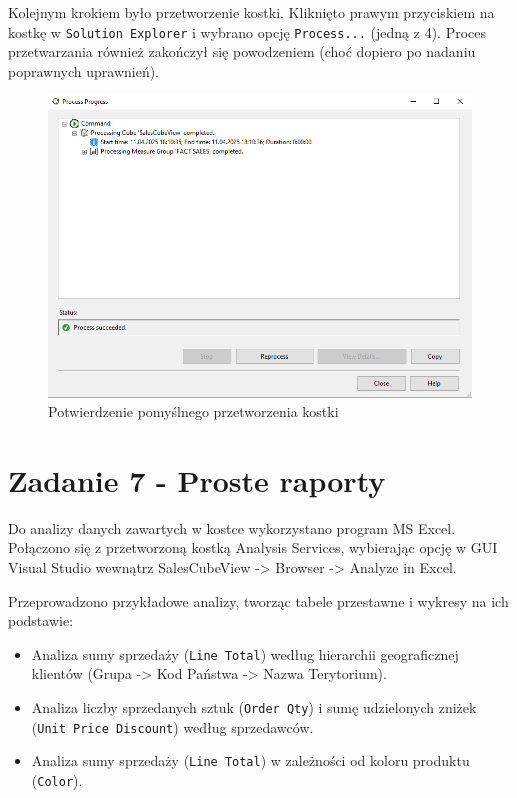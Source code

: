 \documentclass[a4paper,12pt]{article}
\begin{document}
Kolejnym krokiem było przetworzenie kostki. Kliknięto prawym przyciskiem na kostkę w \texttt{Solution Explorer} i wybrano opcję \texttt{Process...} (jedną z 4). Proces przetwarzania również zakończył się powodzeniem (choć dopiero po nadaniu poprawnych uprawnień).

\begin{figure}[H]
    \centering
    \includegraphics[width=1.0\textwidth]{images/6_success.png}
    \caption{Potwierdzenie pomyślnego przetworzenia kostki}
\end{figure}

\section{Zadanie 7 - Proste raporty}

Do analizy danych zawartych w kostce wykorzystano program MS Excel. Połączono się z przetworzoną kostką Analysis Services, wybierając opcję w GUI Visual Studio wewnątrz SalesCubeView -> Browser -> Analyze in Excel.

Przeprowadzono przykładowe analizy, tworząc tabele przestawne i wykresy na ich podstawie:
\begin{itemize}
    \item Analiza sumy sprzedaży (\texttt{Line Total}) według hierarchii geograficznej klientów (Grupa -> Kod Państwa -> Nazwa Terytorium).
    \item Analiza liczby sprzedanych sztuk (\texttt{Order Qty}) i sumę udzielonych zniżek (\texttt{Unit Price Discount}) według sprzedawców.
    \item Analiza sumy sprzedaży (\texttt{Line Total}) w zależności od koloru produktu (\texttt{Color}).
\end{itemize}
\end{document}
